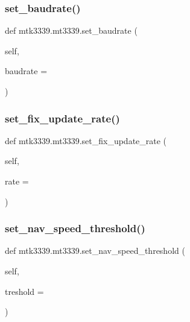 \subsubsection{\texorpdfstring{set\+\_\+baudrate()}{set\_baudrate()}}
{\footnotesize\ttfamily def mtk3339.\+mt3339.\+set\+\_\+baudrate (\begin{DoxyParamCaption}\item[{}]{self,  }\item[{}]{baudrate = {} }\end{DoxyParamCaption})}

\mbox{\label{classmtk3339_1_1mt3339_a19f72767a99406ec267c5024d4f5f671}} 
\subsubsection{\texorpdfstring{set\+\_\+fix\+\_\+update\+\_\+rate()}{set\_fix\_update\_rate()}}
{\footnotesize\ttfamily def mtk3339.\+mt3339.\+set\+\_\+fix\+\_\+update\+\_\+rate (\begin{DoxyParamCaption}\item[{}]{self,  }\item[{}]{rate = {} }\end{DoxyParamCaption})}

\mbox{\label{classmtk3339_1_1mt3339_ae6d1513233a559eddb7d95dff70551d1}} 
\subsubsection{\texorpdfstring{set\+\_\+nav\+\_\+speed\+\_\+threshold()}{set\_nav\_speed\_threshold()}}
{\footnotesize\ttfamily def mtk3339.\+mt3339.\+set\+\_\+nav\+\_\+speed\+\_\+threshold (\begin{DoxyParamCaption}\item[{}]{self,  }\item[{}]{treshold = {} }\end{DoxyParamCaption})}

